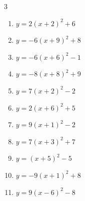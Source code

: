\begin{multicols}{3}
\begin{enumerate}
        \phantom{$\displaystyle 頂点\left( -10 , -10 \right)$}

  \item $\displaystyle y=2\left( x+2\right)^{2}+6$

        \phantom{$\displaystyle 頂点\left( -2 , 6 \right)$}

  \item $\displaystyle y=-6\left( x+9\right)^{2}+8$

        \phantom{$\displaystyle 頂点\left( -9 , 8 \right)$}

  \item $\displaystyle y=-6\left( x+6\right)^{2}-1$

        \phantom{$\displaystyle 頂点\left( -6 , -1 \right)$}

  \item $\displaystyle y=-8\left( x+8\right)^{2}+9$

        \phantom{$\displaystyle 頂点\left( -8 , 9 \right)$}

  \item $\displaystyle y=7\left( x+2\right)^{2}-2$

        \phantom{$\displaystyle 頂点\left( -2 , -2 \right)$}

  \item $\displaystyle y=2\left( x+6\right)^{2}+5$

        \phantom{$\displaystyle 頂点\left( -6 , 5 \right)$}

  \item $\displaystyle y=9\left( x+1\right)^{2}-2$

        \phantom{$\displaystyle 頂点\left( -1 , -2 \right)$}

  \item $\displaystyle y=7\left( x+3\right)^{2}+7$

        \phantom{$\displaystyle 頂点\left( -3 , 7 \right)$}

  \item $\displaystyle y=\left( x+5\right)^{2}-5$

        \phantom{$\displaystyle 頂点\left( -5 , -5 \right)$}

  \item $\displaystyle y=-9\left( x+1\right)^{2}+8$

        \phantom{$\displaystyle 頂点\left( -1 , 8 \right)$}

  \item $\displaystyle y=9\left( x-6\right)^{2}-8$

        \phantom{$\displaystyle 頂点\left( 6 , -8 \right)$}


\end{enumerate}
\end{multicols}
